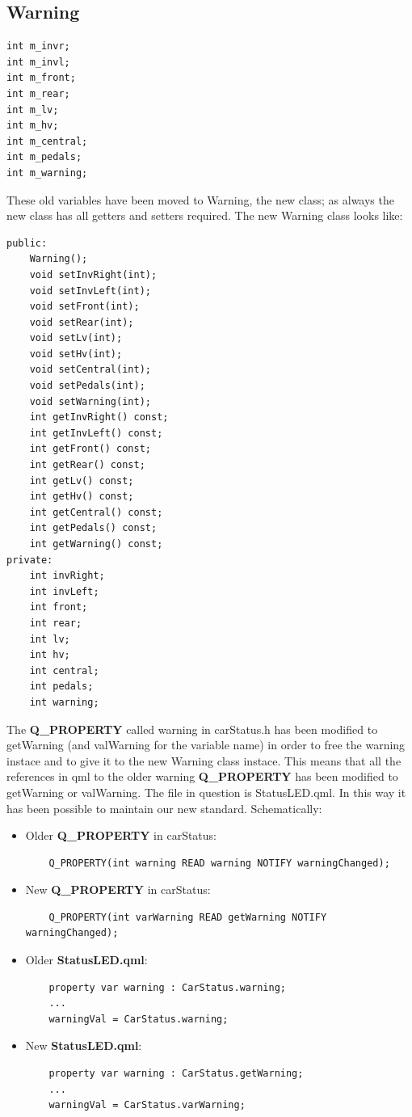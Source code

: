 \documentclass[12pt, letterpaper]{article}
\begin{document}
\subsection{Warning}
\begin{verbatim}
int m_invr;
int m_invl;
int m_front;
int m_rear;
int m_lv;
int m_hv;
int m_central;
int m_pedals;
int m_warning;
\end{verbatim}
These old variables have been moved to Warning, the new class; as always the new class has all getters and setters required.\newline
The new Warning class looks like:
\begin{verbatim}
public:
    Warning();
    void setInvRight(int);
    void setInvLeft(int);
    void setFront(int);
    void setRear(int);
    void setLv(int);
    void setHv(int);
    void setCentral(int);
    void setPedals(int);
    void setWarning(int);
    int getInvRight() const;
    int getInvLeft() const;
    int getFront() const;
    int getRear() const;
    int getLv() const;
    int getHv() const;
    int getCentral() const;
    int getPedals() const;
    int getWarning() const;
private:
    int invRight;
    int invLeft;
    int front;
    int rear;
    int lv;
    int hv;
    int central;
    int pedals;
    int warning;
\end{verbatim}
The \textbf{Q\_PROPERTY} called warning in carStatus.h has been modified to getWarning (and valWarning for the variable name) in order to free the warning instace and to give it to the new Warning class instace. This means that all the references in qml to the older warning \textbf{Q\_PROPERTY} has been modified to getWarning or valWarning. The file in question is StatusLED.qml. In this way it has been possible to maintain our new standard.\newline
Schematically:
\begin{itemize}
    \item Older \textbf{Q\_PROPERTY} in carStatus:
    \begin{verbatim}
    Q_PROPERTY(int warning READ warning NOTIFY warningChanged);
    \end{verbatim}
    \item New \textbf{Q\_PROPERTY} in carStatus:
    \begin{verbatim}
    Q_PROPERTY(int varWarning READ getWarning NOTIFY warningChanged);
    \end{verbatim}
    \item Older \textbf{StatusLED.qml}:
    \begin{verbatim}
    property var warning : CarStatus.warning;
    ...
    warningVal = CarStatus.warning;
    \end{verbatim}
    \item New \textbf{StatusLED.qml}:
    \begin{verbatim}
    property var warning : CarStatus.getWarning;
    ...
    warningVal = CarStatus.varWarning;
    \end{verbatim}
\end{itemize}
\end{document}

